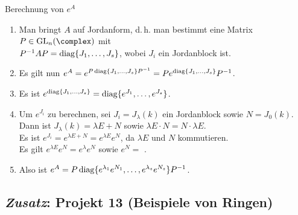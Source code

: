 \begin{Prozedur}{Berechnung von $e^A$}
    \begin{enumerate}
        \item
        Man bringt $A$ auf Jordanform, d.\,h. man bestimmt eine Matrix
        $P \in \GL_n(\complex)$ mit \\
        $P^{-1} A P = \operatorname{diag}\{J_1, \dotsc, J_s\}$,
        wobei $J_i$ ein Jordanblock ist.

        \item
        Es gilt nun $e^A = e^{P \operatorname{diag}\{J_1, \dotsc, J_s\} P^{-1}} =
        P e^{\operatorname{diag}\{J_1, \dotsc, J_s\}} P^{-1}$.

        \item
        Es ist $e^{\operatorname{diag}\{J_1, \dotsc, J_s\}} =
        \operatorname{diag}\{e^{J_1}, \dotsc, e^{J_s}\}$.

        \item
        Um $e^{J_i}$ zu berechnen, sei $J_i = J_\lambda(k)$ ein Jordanblock
        sowie $N = J_0(k)$. \\
        Dann ist $J_\lambda(k) = \lambda E + N$ sowie
        $\lambda E \cdot N = N \cdot \lambda E$. \\
        Es ist $e^{J_i} = e^{\lambda E + N} = e^{\lambda E} e^N$,
        da $\lambda E$ und $N$ kommutieren. \\
        Es gilt $e^{\lambda E} e^N = e^\lambda e^N$ sowie
        $e^N =$ .

        \item
        Also ist $e^A = P \operatorname{diag}\{e^{\lambda_1} e^{N_1}, \dotsc,
        e^{\lambda_s} e^{N_s}\} P^{-1}$.
    \end{enumerate}
\end{Prozedur}

\subsection{%
    \emph{Zusatz}: Projekt 13 (Beispiele von Ringen)%
}

